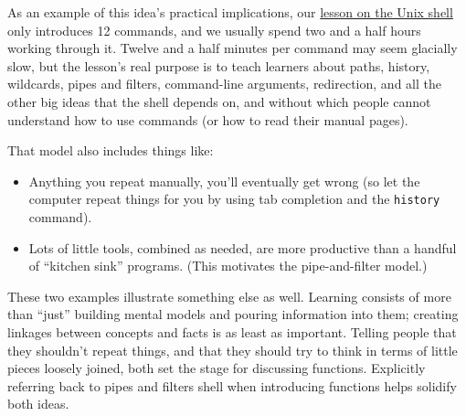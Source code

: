 As an example of this idea's practical implications, our
\href{http://swcarpentry.github.io/shell-novice/}{lesson on the Unix
shell} only introduces 12 commands, and we usually spend two and a half
hours working through it. Twelve and a half minutes per command may seem
glacially slow, but the lesson's real purpose is to teach learners about
paths, history, wildcards, pipes and filters, command-line arguments,
redirection, and all the other big ideas that the shell depends on, and
without which people cannot understand how to use commands (or how to
read their manual pages).

That model also includes things like:

\begin{itemize}
\item
  Anything you repeat manually, you'll eventually get wrong (so let the
  computer repeat things for you by using tab completion and the
  \texttt{history} command).
\item
  Lots of little tools, combined as needed, are more productive than a
  handful of ``kitchen sink'' programs. (This motivates the
  pipe-and-filter model.)
\end{itemize}

These two examples illustrate something else as well. Learning consists
of more than ``just'' building mental models and pouring information
into them; creating linkages between concepts and facts is as least as
important. Telling people that they shouldn't repeat things, and that
they should try to think in terms of little pieces loosely joined, both
set the stage for discussing functions. Explicitly referring back to
pipes and filters shell when introducing functions helps solidify both
ideas.

